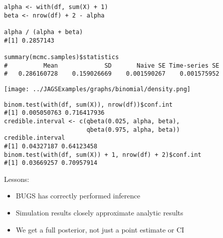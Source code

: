 \documentclass{beamer}
\begin{document}
\begin{frame}[fragile]
  \begin{verbatim}
alpha <- with(df, sum(X) + 1)
beta <- nrow(df) + 2 - alpha

alpha / (alpha + beta)
#[1] 0.2857143

summary(mcmc.samples)$statistics
#          Mean             SD       Naive SE Time-series SE 
#   0.286160728    0.159026669    0.001590267    0.001575952 
  \end{verbatim}
\end{frame}

%

\begin{frame}[fragile]
  \begin{center}
    \texttt{[image: ../JAGSExamples/graphs/binomial/density.png]}
  \end{center}
\end{frame}

\begin{frame}[fragile]
  \begin{verbatim}
binom.test(with(df, sum(X)), nrow(df))$conf.int
#[1] 0.005050763 0.716417936
credible.interval <- c(qbeta(0.025, alpha, beta),
                       qbeta(0.975, alpha, beta))
credible.interval
#[1] 0.04327187 0.64123458
binom.test(with(df, sum(X)) + 1, nrow(df) + 2)$conf.int
#[1] 0.03669257 0.70957914
  \end{verbatim}
\end{frame}

\begin{frame}[fragile]
  Lessons:
  
  \begin{itemize}
    \item{BUGS has correctly performed inference}
    \item{Simulation results closely approximate analytic results}
    \item{We get a full posterior, not just a point estimate or CI}
  \end{itemize}
\end{frame}
\end{document}
